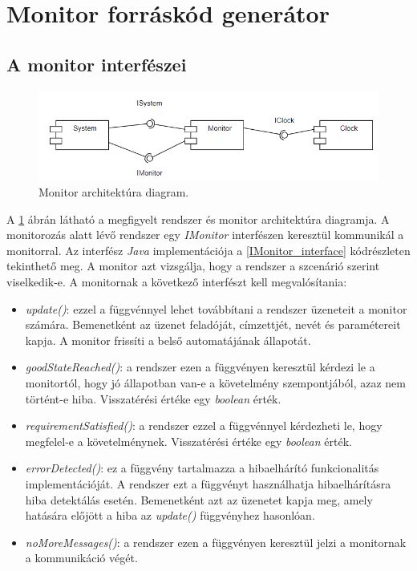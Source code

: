\section{Monitor forráskód generátor}

\subsection{A monitor interfészei}

\begin{figure}[h!]
    \centering
    \includegraphics[width=130mm, keepaspectratio]{figures/monitor_architecture.png}
    \caption{Monitor architektúra diagram.}
	\label{monitor_architecture}
\end{figure}

A \ref{monitor_architecture} ábrán látható a megfigyelt rendszer és monitor architektúra diagramja.
A monitorozás alatt lévő rendszer egy \textit{IMonitor} interfészen keresztül kommunikál a monitorral.
Az interfész \textit{Java} implementációja a \ref{IMonitor_interface} kódrészleten tekinthető meg.
A monitor azt vizsgálja, hogy a rendszer a szcenárió szerint viselkedik-e.
A monitornak a következő interfészt kell megvalósítania:
\begin{itemize}
    \item \textit{update()}: ezzel a függvénnyel lehet továbbítani a rendszer üzeneteit a monitor számára.
	Bemenetként az üzenet feladóját, címzettjét, nevét és paramétereit kapja.
	A monitor frissíti a belső automatájának állapotát.
    \item \textit{goodStateReached()}: a rendszer ezen a függvényen keresztül kérdezi le a monitortól, hogy jó állapotban van-e a követelmény szempontjából, azaz nem történt-e hiba.
    Visszatérési értéke egy \textit{boolean} érték.
    \item \textit{requirementSatisfied()}: a rendszer ezzel a függvénnyel kérdezheti le, hogy megfelel-e a követelménynek.
    Visszatérési értéke egy \textit{boolean} érték.
	\item \textit{errorDetected()}: ez a függvény tartalmazza a hibaelhárító funkcionalitás implementációját.
	A rendszer ezt a függvényt használhatja hibaelhárításra hiba detektálás esetén.
	Bemenetként azt az üzenetet kapja meg, amely hatására előjött a hiba az \textit{update()} függvényhez hasonlóan.
    \item \textit{noMoreMessages()}: a rendszer ezen a függvényen keresztül jelzi a monitornak a kommunikáció végét.
\end{itemize}

